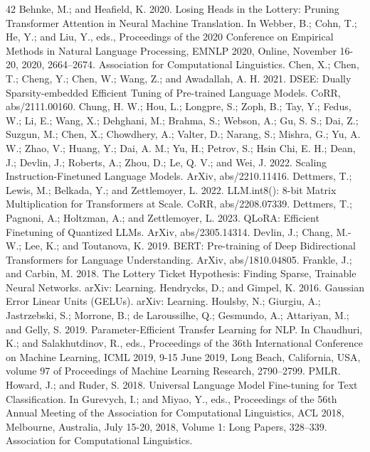 \documentclass[10pt,twocolumn]{article}
\begin{document}
\begin{thebibliography}{42}
 Behnke, M.; and Heafield, K. 2020. Losing Heads in the Lottery: Pruning Transformer Attention in Neural Machine Translation. In Webber, B.; Cohn, T.; He, Y.; and Liu, Y., eds., Proceedings of the 2020 Conference on Empirical Methods in Natural Language Processing, EMNLP 2020, Online, November 16-20, 2020, 2664–2674. Association for Computational Linguistics.
 Chen, X.; Chen, T.; Cheng, Y.; Chen, W.; Wang, Z.; and Awadallah, A. H. 2021. DSEE: Dually Sparsity-embedded Efficient Tuning of Pre-trained Language Models. CoRR, abs/2111.00160.
 Chung, H. W.; Hou, L.; Longpre, S.; Zoph, B.; Tay, Y.; Fedus, W.; Li, E.; Wang, X.; Dehghani, M.; Brahma, S.; Webson, A.; Gu, S. S.; Dai, Z.; Suzgun, M.; Chen, X.; Chowdhery, A.; Valter, D.; Narang, S.; Mishra, G.; Yu, A. W.; Zhao, V.; Huang, Y.; Dai, A. M.; Yu, H.; Petrov, S.; Hsin Chi, E. H.; Dean, J.; Devlin, J.; Roberts, A.; Zhou, D.; Le, Q. V.; and Wei, J. 2022. Scaling Instruction-Finetuned Language Models. ArXiv, abs/2210.11416.
 Dettmers, T.; Lewis, M.; Belkada, Y.; and Zettlemoyer, L. 2022. LLM.int8(): 8-bit Matrix Multiplication for Transformers at Scale. CoRR, abs/2208.07339.
 Dettmers, T.; Pagnoni, A.; Holtzman, A.; and Zettlemoyer, L. 2023. QLoRA: Efficient Finetuning of Quantized LLMs. ArXiv, abs/2305.14314.
 Devlin, J.; Chang, M.-W.; Lee, K.; and Toutanova, K. 2019. BERT: Pre-training of Deep Bidirectional Transformers for Language Understanding. ArXiv, abs/1810.04805.
 Frankle, J.; and Carbin, M. 2018. The Lottery Ticket Hypothesis: Finding Sparse, Trainable Neural Networks. arXiv: Learning.
 Hendrycks, D.; and Gimpel, K. 2016. Gaussian Error Linear Units (GELUs). arXiv: Learning.
 Houlsby, N.; Giurgiu, A.; Jastrzebski, S.; Morrone, B.; de Laroussilhe, Q.; Gesmundo, A.; Attariyan, M.; and Gelly, S. 2019. Parameter-Efficient Transfer Learning for NLP. In Chaudhuri, K.; and Salakhutdinov, R., eds., Proceedings of the 36th International Conference on Machine Learning, ICML 2019, 9-15 June 2019, Long Beach, California, USA, volume 97 of Proceedings of Machine Learning Research, 2790–2799. PMLR.
 Howard, J.; and Ruder, S. 2018. Universal Language Model Fine-tuning for Text Classification. In Gurevych, I.; and Miyao, Y., eds., Proceedings of the 56th Annual Meeting of the Association for Computational Linguistics, ACL 2018, Melbourne, Australia, July 15-20, 2018, Volume 1: Long Papers, 328–339. Association for Computational Linguistics.

\end{thebibliography}
\end{document}
